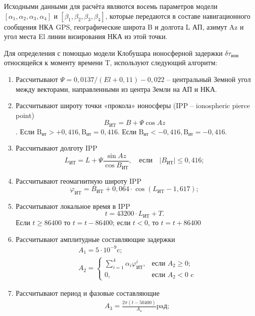 \documentclass[14pt,a4paper,oneside]{extarticle}
\begin{document}
Исходными данными для расчёта являются восемь параметров модели $[\alpha_1,\alpha_2,\alpha_3,\alpha_4]$ и $[\beta_1,\beta_2,\beta_3,\beta_4]$, которые передаются в составе навигационного сообщения НКА GPS, географические широта B и долгота L АП, азимут Az и угол места El линии визирования НКА из этой точки.

Для определения с помощью модели Клобушара ионосферной задержки $\delta\tau_{\text{ион}}$ относящейся к моменту времени T, используют следующий алгоритм:

\begin{enumerate}
    \item Рассчитывают $\Psi=0,0137/(El+0,11)-0,022$ – центральный Земной угол между векторами, направленными из центра Земли на АП и НКА.
    \item Рассчитывают широту точки «прокола» ионосферы (IPP – ionospheric pierce point) \[B_\text{ИT}=B+\Psi\cos Az\]. Если $\text{B}_\text{ит}{ > + 0 , 4 1 6 , \text{B}_\text{ит}{ = 0 , 4 1 6 }}.$ Если $\text{B}_\text{ит}{ < - 0 , 4 1 6 , \text{B}_\text{ит}{ = -0 , 4 1 6 }}.$
    \item Рассчитывают долготу IPP \[L_{\text{ИТ}}=L+\Psi\frac{\sin Az}{\cos B_{\text{ИТ}}},\quad\text{если}\quad|B_{\text{ИТ}}|\leqslant0,416;\]
    \item Рассчитывают геомагнитную широту IPP \[\varphi_{\text{ИT}}=B_{\text{ИT}}+0{,}064\cdot\cos(L_{\text{ИT}}-1{,}617);\]
    \item Рассчитывают локальное время в IPP \[t=43200\cdot L_\text{ИТ}+T.\] Если $t\geq 86400$ то $t=t-86400$; если $t<0$, то $t=t+86400$
    \item Рассчитывают амплитудные составляющие задержки \[\begin{aligned}
                   & A_{1} =5\cdot10^{-9}\mathrm{c};                                                                                                                         \\
                   & A_{2} =\begin{cases}\sum\limits_{i=1}^4\alpha_i\varphi_{\text{ИТ}}^i,&\text{если }A_2\geqslant0;\\0,&\text{если }A_2<0\text{ c}\end{cases}
              \end{aligned}\]
    \item Рассчитывают период и фазовые составляющие \[\begin{aligned}
                   & A_{3} =\frac{2\pi(t-50400)}{A_{4}}\text{paд};                                                                                                                     \\

\end{aligned}\]
\end{enumerate}
\end{document}
